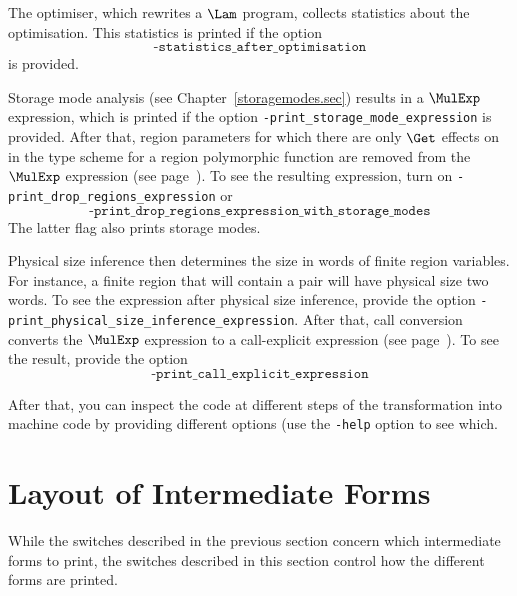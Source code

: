\documentclass[12pt]{book}
\begin{document}
The optimiser, which rewrites a $\Lam$
program, collects statistics about the optimisation. This statistics
is printed if the option $$\texttt{-statistics\_after\_optimisation}$$ %
%
%
is provided.

Storage mode analysis (see Chapter~\ref{storagemodes.sec}) results in
a $\MulExp$ expression, which is printed if the option
%
\texttt{-print\_storage\_mode\_expression} is provided.  After that, region parameters
for which there are only $\Get$ effects on in the type scheme for a
region polymorphic function are removed from the $\MulExp$ expression
(see page~\pageref{bother-to-distinguish-get-n-put}).  To see the
resulting expression, turn on
%
\texttt{-print\_drop\_regions\_expression} or
$$\texttt{-print\_drop\_regions\_expression\_with\_storage\_modes}$$
The latter flag also prints storage modes.

%
%
Physical size inference then determines the size in words of finite
region variables.  For instance, a finite region that will contain a
pair will have physical size two words.  To see the expression after
physical size inference, provide the option
%
\texttt{-print\_physical\_size\_inference\_expression}.  After that,
%
call conversion converts the $\MulExp$ expression to a
call-explicit expression (see
page~\pageref{call-explicit}).  To see the result, provide the option
$$\texttt{-print\_call\_explicit\_expression}$$

After that, you can inspect the code at different steps of the
transformation into machine code by providing different options (use
the \texttt{-help} option to see which.

\section{Layout of Intermediate Forms}
\label{layout_intermediate_forms.sec}
While the switches described in the previous section concern which
intermediate forms to print, the switches described in this section
%
%
%
control how the different forms are printed.
\end{document}
